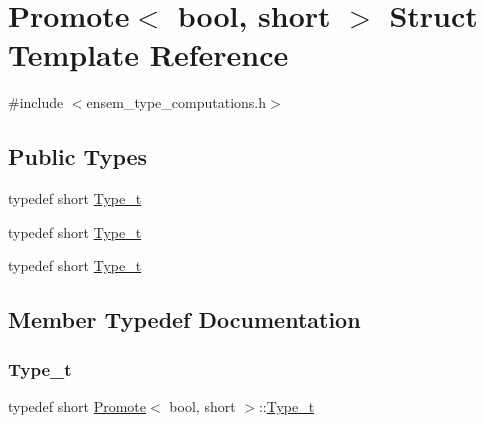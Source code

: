 \hypertarget{structPromote_3_01bool_00_01short_01_4}{}\section{Promote$<$ bool, short $>$ Struct Template Reference}
\label{structPromote_3_01bool_00_01short_01_4}


{\ttfamily \#include $<$ensem\+\_\+type\+\_\+computations.\+h$>$}

\subsection*{Public Types}
\begin{DoxyCompactItemize}
\item 
typedef short \mbox{\hyperlink{structPromote_3_01bool_00_01short_01_4_aca2abaabb10b6748b41ca6064716e6b4}{Type\+\_\+t}}
\item 
typedef short \mbox{\hyperlink{structPromote_3_01bool_00_01short_01_4_aca2abaabb10b6748b41ca6064716e6b4}{Type\+\_\+t}}
\item 
typedef short \mbox{\hyperlink{structPromote_3_01bool_00_01short_01_4_aca2abaabb10b6748b41ca6064716e6b4}{Type\+\_\+t}}
\end{DoxyCompactItemize}


\subsection{Member Typedef Documentation}
\mbox{\label{structPromote_3_01bool_00_01short_01_4_aca2abaabb10b6748b41ca6064716e6b4}} 
\subsubsection{\texorpdfstring{Type\_t}{Type\_t}\hspace{0.1cm}{\footnotesize\ttfamily [1/3]}}
{\footnotesize\ttfamily typedef short \mbox{\hyperlink{structPromote}{Promote}}$<$ bool, short $>$\+::\mbox{\hyperlink{structPromote_3_01bool_00_01short_01_4_aca2abaabb10b6748b41ca6064716e6b4}{Type\+\_\+t}}}

\mbox{\label{structPromote_3_01bool_00_01short_01_4_aca2abaabb10b6748b41ca6064716e6b4}} 
